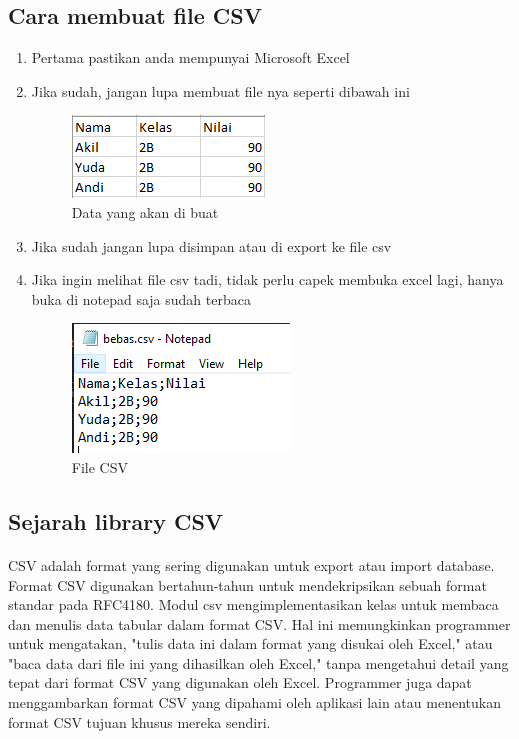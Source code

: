 \documentclass{article}
\begin{document}
\subsection{Cara membuat file CSV}
\begin{enumerate}
    \item Pertama pastikan anda mempunyai Microsoft Excel
    \item Jika sudah, jangan lupa membuat file nya seperti dibawah ini
    \begin{figure}[!htbp]
        \centering
        \includegraphics{figure/csv.PNG}
        \caption{Data yang akan di buat}
    \end{figure}
\newpage
    \item Jika sudah jangan lupa disimpan atau di export ke file csv
    \item Jika ingin melihat file csv tadi, tidak perlu capek membuka excel lagi, hanya buka di notepad saja sudah terbaca
    \begin{figure}[!htbp]
        \centering
        \includegraphics{figure/liatcsv.PNG}
        \caption{File CSV}
    \end{figure}
\end{enumerate}
\subsection{Sejarah library CSV}
\paragraph{}
CSV adalah format yang sering digunakan untuk export atau import database. Format CSV digunakan bertahun-tahun untuk mendekripsikan sebuah format standar pada RFC4180. Modul csv mengimplementasikan kelas untuk membaca dan menulis data tabular dalam format CSV. Hal ini memungkinkan programmer untuk mengatakan, "tulis data ini dalam format yang disukai oleh Excel," atau "baca data dari file ini yang dihasilkan oleh Excel," tanpa mengetahui detail yang tepat dari format CSV yang digunakan oleh Excel. Programmer juga dapat menggambarkan format CSV yang dipahami oleh aplikasi lain atau menentukan format CSV tujuan khusus mereka sendiri.
\newpage
\end{document}
